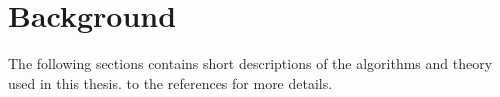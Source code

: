 \section{Background}
\label{sec:background}
The following sections contains short descriptions of the algorithms and theory used in this thesis.
to the references for more details.









